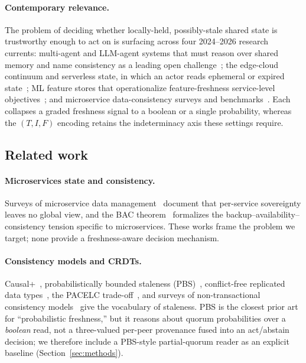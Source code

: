 \documentclass[fleqn,10pt]{wlscirep}
\begin{document}
\paragraph{Contemporary relevance.} The problem of deciding whether locally-held, possibly-stale shared
state is trustworthy enough to act on is surfacing across four 2024--2026 research currents: multi-agent
and LLM-agent systems that must reason over shared memory and name consistency as a leading open
challenge~\cite{chang2025sagallm}; the edge-cloud continuum and serverless state, in which an actor reads
ephemeral or expired state~\cite{marcelino2024goldfish}; ML feature stores that operationalize
feature-freshness service-level objectives~\cite{delarua2024hopsworks,wooders2024ralf}; and microservice
data-consistency surveys and benchmarks~\cite{laigner2021data,laigner2025marketplace,rodrigues2025slr}.
Each collapses a graded freshness signal to a boolean or a single probability, whereas the $(T,I,F)$
encoding retains the indeterminacy axis these settings require.

\subsection{Related work}
\label{sec:related}

\paragraph{Microservices state and consistency.} Surveys of microservice data
management~\cite{soldani2018pains,laigner2021data} document that per-service sovereignty leaves no
global view, and the BAC theorem~\cite{pardon2018bac} formalizes the backup--availability--consistency
tension specific to microservices. These works frame the problem we target; none provide a
freshness-aware decision mechanism.

\paragraph{Consistency models and CRDTs.} Causal+~\cite{lloyd2011cops}, probabilistically bounded
staleness (PBS)~\cite{bailis2012pbs}, conflict-free replicated data types~\cite{shapiro2011crdt,preguica2018crdt},
the PACELC trade-off~\cite{abadi2012consistency}, and surveys of non-transactional consistency
models~\cite{viotti2016consistency} give the vocabulary of staleness. PBS is the closest prior art for
``probabilistic freshness,'' but it reasons about quorum probabilities over a \emph{boolean} read,
not a three-valued per-peer provenance fused into an act/abstain decision; we therefore include a
PBS-style partial-quorum reader as an explicit baseline (Section~\ref{sec:methods}).
\end{document}

